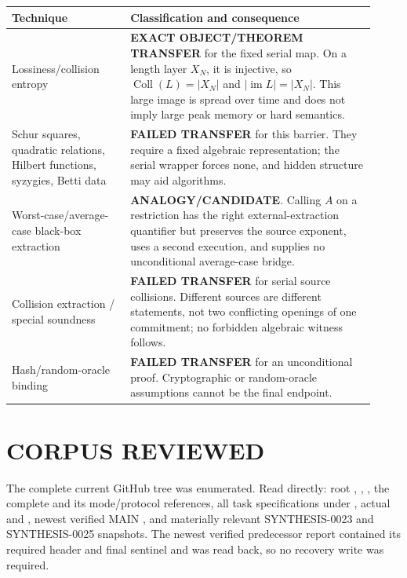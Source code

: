 \documentclass[11pt]{article}
\begin{document}
\begin{longtable}{@{}p{0.30\linewidth}p{0.62\linewidth}@{}}
\toprule
Technique & Classification and consequence\\ \midrule
Lossiness/collision entropy & \textbf{EXACT OBJECT/THEOREM TRANSFER} for the fixed serial map.  On a length layer $X_N$, it is injective, so $\operatorname{Coll}(L)=|X_N|$ and $|\operatorname{im}L|=|X_N|$.  This large image is spread over time and does not imply large peak memory or hard semantics.\\
Schur squares, quadratic relations, Hilbert functions, syzygies, Betti data & \textbf{FAILED TRANSFER} for this barrier.  They require a fixed algebraic representation; the serial wrapper forces none, and hidden structure may aid algorithms.\\
Worst-case/average-case black-box extraction & \textbf{ANALOGY/CANDIDATE}.  Calling $A$ on a restriction has the right external-extraction quantifier but preserves the source exponent, uses a second execution, and supplies no unconditional average-case bridge.\\
Collision extraction / special soundness & \textbf{FAILED TRANSFER} for serial source collisions.  Different sources are different statements, not two conflicting openings of one commitment; no forbidden algebraic witness follows.\\
Hash/random-oracle binding & \textbf{FAILED TRANSFER} for an unconditional proof.  Cryptographic or random-oracle assumptions cannot be the final endpoint.\\
\bottomrule
\end{longtable}

\section{CORPUS REVIEWED}

The complete current GitHub tree was enumerated.  Read directly: root
, , , the complete
 and its mode/protocol references,
all task specifications under , actual  and
, newest verified MAIN
, and materially
relevant SYNTHESIS-0023 and SYNTHESIS-0025 snapshots.  The newest verified
predecessor report
contained its required header and final sentinel and was read back, so no
recovery write was required.
\end{document}
